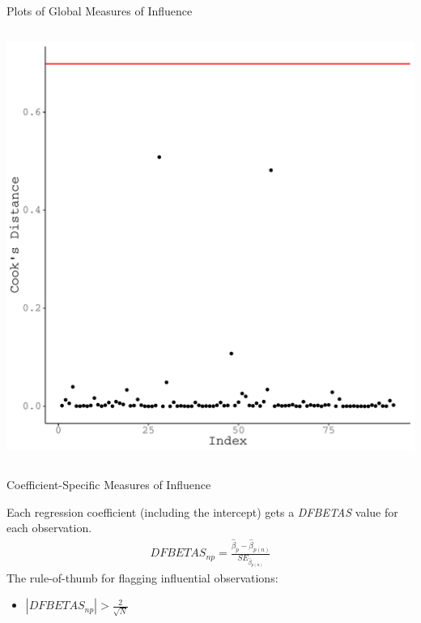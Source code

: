 \documentclass{beamer}\usepackage[]{graphicx}\usepackage[]{color}
\makeatletter
\def\maxwidth{ %
  \ifdim\Gin@nat@width>\linewidth
    \linewidth
  \else
    \Gin@nat@width
  \fi
}
\newenvironment{knitrout}{}{} %
\makeatother
\begin{document}
\begin{frame}{Plots of Global Measures of Influence}
\begin{columns}
\begin{column}{0.5\textwidth}
\begin{knitrout}
{\centering \includegraphics[width=\maxwidth]{figure/unnamed-chunk-31-1} 

}



\end{knitrout}

\end{column}
\end{columns}

\end{frame}

\watermarkon %

\begin{frame}{Coefficient-Specific Measures of Influence}
  
  Each regression coefficient (including the intercept) gets a \emph{DFBETAS}
  value for each observation.
  \begin{align*}
    \textit{DFBETAS}_{np} = \frac{\hat{\beta}_p - \hat{\beta}_{p(n)}}
           {\textit{SE}_{\hat{\beta}_{p(n)}}}
  \end{align*}
  The rule-of-thumb for flagging influential observations:
  \vb
  \begin{itemize}
  \item $|\textit{DFBETAS}_{np}| > \frac{2}{\sqrt{N}}$
  \end{itemize}
  
\end{frame}
\end{document}

